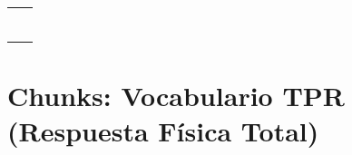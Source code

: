 \documentclass[12pt,a4paper]{article}
\begin{document}
\begin{cajachunk}
\begin{tabularx}{\textwidth}{@{} X l @{}}
\eng{My name is \underline{\hspace{2cm}}.} & \esp{Mi nombre es \underline{\hspace{2cm}}.} \\
\eng{I am from \underline{\hspace{2cm}}.} & \esp{Soy de \underline{\hspace{2cm}}.} \\
\eng{I am \underline{\hspace{1cm}} years old.} & \esp{Tengo \underline{\hspace{1cm}} años.} \\
\eng{I live in \underline{\hspace{2cm}}.} & \esp{Vivo en \underline{\hspace{2cm}}.} \\
\eng{I speak Spanish.} & \esp{Hablo español.} \\
\eng{I am a student.} & \esp{Soy estudiante.} \\
\eng{I like \underline{\hspace{2cm}}.} & \esp{Me gusta \underline{\hspace{2cm}}.} \\
\end{tabularx}
\end{cajachunk}

\section{Chunks: Vocabulario TPR (Respuesta Física Total)}
\end{document}
